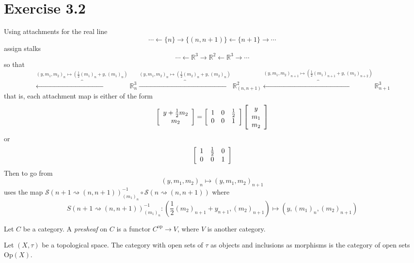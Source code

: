 \documentclass{letter}
\begin{document}
  \section*{Exercise 3.2}
  Using attachments for the real line
  $$
  \cdots \longleftarrow \{n\} \longrightarrow \{(n, n+1)\} \longleftarrow \{n+1\} \longrightarrow \cdots
  $$
  assign stalks
  $$
  \cdots \longleftarrow \mathbb{R}^3 \longrightarrow \mathbb{R}^2
         \longleftarrow \mathbb{R}^3 \longrightarrow \cdots
  $$
  so that
  $$
  \overbrace{\longleftarrow}^{(y, m_1, m_2)_n \mapsto \left(\frac{1}{2}(m_1)_n + y, (m_1)_n\right)}
  \mathbb{R}^{3}_n
  \overbrace{\longrightarrow}^{(y, m_1, m_2)_n \mapsto \left(\frac{1}{2}(m_2)_n + y, (m_2)_n\right)}
  \mathbb{R}^{2}_{(n, n+1)}
  \overbrace{\longleftarrow}^{(y, m_1, m_2)_{n+1} \mapsto \left(\frac{1}{2}(m_1)_{n+1} + y, (m_1)_{n+2}\right)}
  \mathbb{R}^{3}_{n+1}
  $$
  that is, each attachment map is either of the form
  $$
  \left[\begin{array}{c}
  y + \frac{1}{2}m_2 \\ m_2
  \end{array}\right] =
  \left[\begin{array}{c c c}
  1 & 0 & \frac{1}{2} \\
  0 & 0 & 1
  \end{array}\right]
  \left[\begin{array}{c}
  y \\ m_1 \\ m_2
  \end{array}\right]
  $$
  or
  $$
  \left[\begin{array}{c c c}
  1 & \frac{1}{2} & 0 \\
  0 & 0 & 1
  \end{array}\right]
  $$
  Then to go from
  $$
  (y, m_1, m_2)_n \mapsto (y, m_1, m_2)_{n+1}
  $$
  uses the map
  $\mathscr{S}(n+1 \rightsquigarrow (n, n+1))^{-1}_{(m_1)_n} \circ
     \mathscr{S}(n \rightsquigarrow (n, n+1))$
  where
  $$
  S(n+1 \rightsquigarrow (n,n+1))^{-1}_{(m_1)_n}
    :       (\frac{1}{2} (m_2)_{n+1} + y_{n+1}, (m_2)_{n+1})
    \mapsto (y, (m_1)_n, (m_2)_{n+1})
  $$

  \begin{defn}[Presheaf]
    Let $C$ be a category. A \emph{presheaf} on $C$ is a functor
    $C^{\mathrm{op}} \to V$, where $V$ is another category.

    Let $(X, \tau)$ be a topological space. The category with
    open sets of $\tau$ as objects and inclusions as morphisms
    is the category of open sets $\mathrm{Op}(X)$.
  \end{defn}
\end{document}
